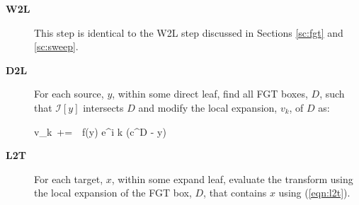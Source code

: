 \begin{description}
\item[\textbf{W2L}] This step is identical to the W2L step discussed in Sections \ref{sc:fgt} and \ref{sc:sweep}.

\item[\textbf{D2L}] For each source, $y$, within some direct leaf, find all FGT boxes, $D$, such that $\mathcal{I}[y]$ intersects $D$ and
modify the local expansion, $v_k$, of $D$ as: 

\beq v_k  \,+=\, \, f(y) e^{i \lambda k \cdot (c^D - y)} \label{eqn:d2l} \eeq

\item[\textbf{L2T}] For each target, $x$, within some expand leaf, evaluate the transform using the local 
expansion of the FGT box, $D$, that contains $x$ using (\ref{eqn:l2t}).
\end{description}



